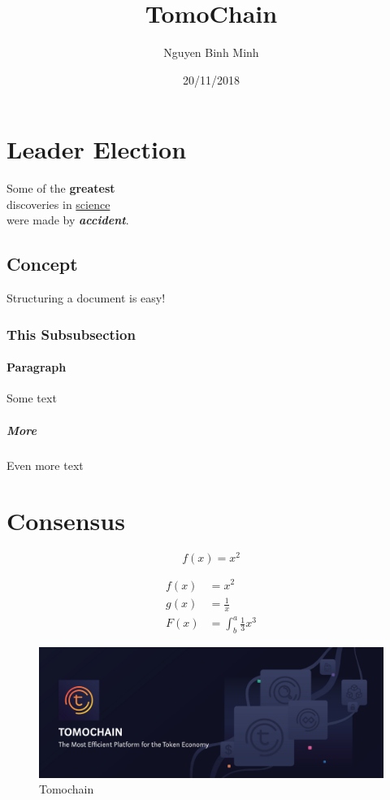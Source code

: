 \documentclass{article}
\title{TomoChain}
\date{20/11/2018}
\author{Nguyen Binh Minh}
\begin{document}
	\maketitle
	\tableofcontents
	\listoffigures
 	\listoftables
	\newpage
	
	\section{Leader Election}
	Some of the \textbf{greatest} \\
	discoveries in \underline{science} \\ 
	were made by \textbf{\textit{accident}}.
	
		\subsection{Concept}
			Structuring a document is easy!
			\subsubsection{This Subsubsection}
		\paragraph{Paragraph}
			Some text
			\subparagraph{More}
			Even more text
	\section{Consensus}

	\begin{equation}
		f(x) = x^2
	\end{equation}
	
	\begin{align*}
 		f(x) &= x^2\\	
 		g(x) &= \frac{1}{x}\\
 		F(x) &= \int^a_b \frac{1}{3}x^3
	\end{align*}

	\begin{figure}[b!]
		\includegraphics[width=\linewidth]{1.png}
		\caption{Tomochain}
	\end{figure}
	
\end{document}
